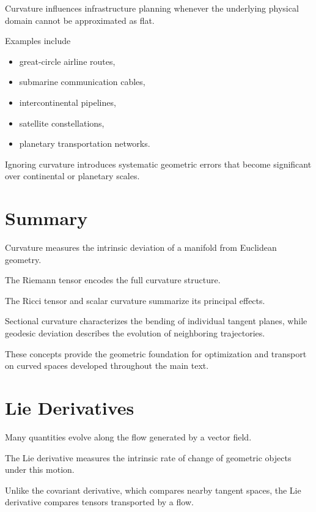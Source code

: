 \documentclass[11pt,fleqn]{book}
\numberwithin{equation}{chapter}
\theoremstyle{plain}
\theoremstyle{definition}
\theoremstyle{remark}
\begin{document}
Curvature influences infrastructure planning whenever the underlying
physical domain cannot be approximated as flat.

Examples include

\begin{itemize}
\item great-circle airline routes,
\item submarine communication cables,
\item intercontinental pipelines,
\item satellite constellations,
\item planetary transportation networks.
\end{itemize}

Ignoring curvature introduces systematic geometric errors that become
significant over continental or planetary scales.


\section{Summary}

Curvature measures the intrinsic deviation of a manifold from Euclidean
geometry.

The Riemann tensor encodes the full curvature structure.

The Ricci tensor and scalar curvature summarize its principal effects.

Sectional curvature characterizes the bending of individual tangent
planes, while geodesic deviation describes the evolution of neighboring
trajectories.

These concepts provide the geometric foundation for optimization and
transport on curved spaces developed throughout the main text.


\section{Lie Derivatives}

Many quantities evolve along the flow generated by a vector field.

The Lie derivative measures the intrinsic rate of change of geometric
objects under this motion.

Unlike the covariant derivative, which compares nearby tangent spaces,
the Lie derivative compares tensors transported by a flow.
\end{document}
